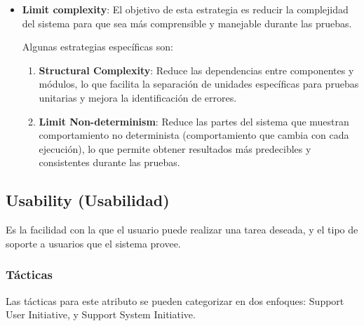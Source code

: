 \documentclass{article}
\begin{document}
\begin{itemize}
\begin{enumerate}
								
				\item \textbf{Assertions}: Se incluyen en el código para garantizar que ciertos estados o condiciones se cumplan durante las pruebas, detectando automáticamente estados fallidos.
				
				
			\end{enumerate}
			
			\item \textbf{Limit complexity}:
			El objetivo de esta estrategia es reducir la complejidad del sistema para que sea más comprensible y manejable durante las pruebas. 
			
			Algunas estrategias específicas son:
			\begin{enumerate}
				\item \textbf{Structural Complexity}: Reduce las dependencias entre componentes y módulos, lo que facilita la separación de unidades específicas para pruebas unitarias y mejora la identificación de errores.
				
				\item \textbf{Limit Non-determinism}: Reduce las partes del sistema que muestran comportamiento no determinista (comportamiento que cambia con cada ejecución), lo que permite obtener resultados más predecibles y consistentes durante las pruebas.
				
			\end{enumerate}	
			
		\end{itemize}
		
		\subsection{Usability  \small{(Usabilidad)}}
		Es la facilidad con la que el usuario puede realizar una tarea deseada, y el tipo de soporte a usuarios que el sistema provee.
		
		\subsubsection{Tácticas}
		Las tácticas para este atributo se pueden categorizar en dos enfoques: Support User Initiative, y Support System Initiative. 
		
\end{document}
